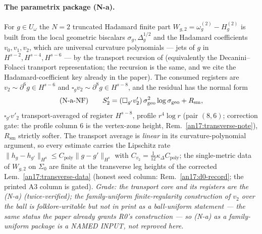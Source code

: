 \paragraph{The parametrix package \textup{(N-a)}.}
For $g\in U_\omega$ the $N{=}2$ truncated Hadamard finite part $W_{g,2}=
\omega^{(2)}_g-H^{(2)}_g$ is built from the local geometric biscalars
$\sigma_g,\Delta_g^{1/2}$ and the Hadamard coefficients $v_0,v_1,v_2$, which are
universal curvature polynomials --- jets of $g$ in $H^{s-2},H^{s-4},H^{s-6}$ ---
by the transport recursion of \cite[Thm.~2.1]{Moretti2003}
(equivalently the Decanini--Folacci transport representation; the recursion is
the same, and we cite the Hadamard-coefficient key already in the paper). The
consumed registers are $v_2\sim\partial^6g\in H^{s-6}$ and
$\square_g v_2\sim\partial^8g\in H^{s-8}$, and the residual has the normal form
\[
 \textup{(N-a-NF)}\qquad
 S'_2=(\square_{g'}v'_2)\,\sigma_{\mathrm{geo}}^2\log\sigma_{\mathrm{geo}}
 +R_{\mathrm{sm}},
\]
$\square_{g'}v'_2$ transport-averaged of register $H^{s-8}$, profile $r^4\log r$
(pair $(8,6)$; correction gate: the profile column $6$ is the vertex-zone height,
Rem.~\ref{an17:transverse-note}), $R_{\mathrm{sm}}$ strictly softer. The transport average is
\emph{linear} in its curvature-polynomial argument, so every estimate carries the
Lipschitz rate $\|h_g-h_{g'}\|_{H^a}\le C_{\mathrm{poly}}\|g-g'\|_{H^s}$ with
$C_{v_2}=\tfrac1{12}\kappa_\Delta C_{\mathrm{poly}}$; the single-metric data of
$W_{g,2}$ on $\Sigma_0$ are finite at the transverse leg heights of the
corrected Lem.~\ref{an17:transverse-data} (honest seed column:
Rem.~\ref{an17:d0-record}; the printed A3 column is gated). \emph{Grade: the transport core and its
registers are the \textup{(N-a)} (twice-verified); the
family-uniform finite-regularity \emph{construction} of $v_2$ over the ball is
folklore-writable but not in print as a ball-uniform statement --- the same
status the paper already grants R0's construction --- so \textup{(N-a)} as a
family-uniform package is a NAMED INPUT, not reproved here.}

